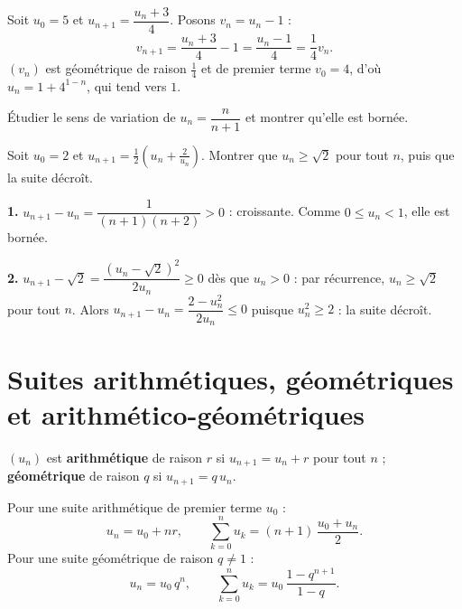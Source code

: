 \begin{exemple}
Soit $u_{0} = 5$ et $u_{n+1} = \dfrac{u_{n}+3}{4}$. Posons $v_{n} = u_{n}-1$ :
\[
  v_{n+1} = \frac{u_{n}+3}{4}-1 = \frac{u_{n}-1}{4} = \frac14 v_{n}.
\]
$(v_{n})$ est géométrique de raison $\frac14$ et de premier terme $v_{0} = 4$,
d'où $u_{n} = 1+4^{1-n}$, qui tend vers $1$.
\end{exemple}

\begin{entrainement}
\exo[\niveau{1}] Étudier le sens de variation de $u_{n} = \dfrac{n}{n+1}$ et
montrer qu'elle est bornée.

\exo[\niveau{2}] Soit $u_{0} = 2$ et $u_{n+1} = \frac12\left(u_{n}
+\frac{2}{u_{n}}\right)$. Montrer que $u_{n} \geq \sqrt2$ pour tout $n$, puis
que la suite décroît.
\end{entrainement}

\begin{corrige}
\textbf{1.} $u_{n+1}-u_{n} = \dfrac{1}{(n+1)(n+2)} > 0$ : croissante. Comme
$0 \leq u_{n} < 1$, elle est bornée.

\textbf{2.} $u_{n+1}-\sqrt2 = \dfrac{\left(u_{n}-\sqrt2\right)^{2}}{2u_{n}} \geq 0$
dès que $u_{n}>0$ : par récurrence, $u_{n} \geq \sqrt2$ pour tout $n$. Alors
$u_{n+1}-u_{n} = \dfrac{2-u_{n}^{2}}{2u_{n}} \leq 0$ puisque
$u_{n}^{2} \geq 2$ : la suite décroît.
\end{corrige}

\section{Suites arithmétiques, géométriques et arithmético-géométriques}

\begin{definition}
$(u_{n})$ est \textbf{arithmétique} de raison $r$ si $u_{n+1} = u_{n}+r$ pour
tout $n$ ; \textbf{géométrique} de raison $q$ si $u_{n+1} = q\,u_{n}$.
\end{definition}

\begin{propriete}
Pour une suite arithmétique de premier terme $u_{0}$ :
\[
  u_{n} = u_{0}+nr, \qquad
  \sum_{k=0}^{n}u_{k} = (n+1)\,\frac{u_{0}+u_{n}}{2}.
\]
Pour une suite géométrique de raison $q \neq 1$ :
\[
  u_{n} = u_{0}\,q^{n}, \qquad
  \sum_{k=0}^{n}u_{k} = u_{0}\,\frac{1-q^{n+1}}{1-q}.
\]
\end{propriete}

